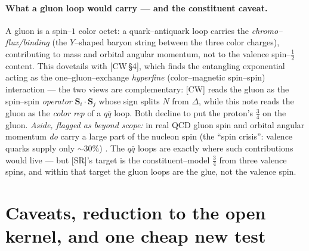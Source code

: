 \documentclass[11pt,oneside]{article}
\newcommand{\halff}{\tfrac{1}{2}}
\theoremstyle{plain}
\begin{document}
\paragraph{What a gluon loop would carry --- and the constituent caveat.}
A gluon is a spin--$1$ color octet: a quark--antiquark loop carries the
\emph{chromo--flux/binding} (the $Y$--shaped baryon string between the three color
charges), contributing to mass and orbital angular momentum, not to the valence
spin--$\halff$ content. This dovetails with [CW\,\S4], which finds the entangling
exponential acting as the one--gluon--exchange \emph{hyperfine} (color--magnetic
spin--spin) interaction --- the two views are complementary: [CW] reads the gluon
as the spin--spin \emph{operator} $\bm S_i\!\cdot\!\bm S_j$ whose sign splits
$N$ from $\Delta$, while this note reads the gluon as the \emph{color rep} of a
$q\bar q$ loop. Both decline to put the proton's $\tfrac34$ on the gluon.
\emph{Aside, flagged as beyond scope:} in real QCD gluon spin and orbital angular
momentum \emph{do} carry a large part of the nucleon spin (the ``spin crisis'':
valence quarks supply only ${\sim}30\%$) \cite{spincrisis}. The $q\bar q$ loops
are exactly where such contributions would live --- but [SR]'s target is the
constituent--model $\tfrac34$ from three valence spins, and within that target the
gluon loops are the glue, not the valence spin.

\section{Caveats, reduction to the open kernel, and one cheap new test}
\label{sec:caveats}
\end{document}
